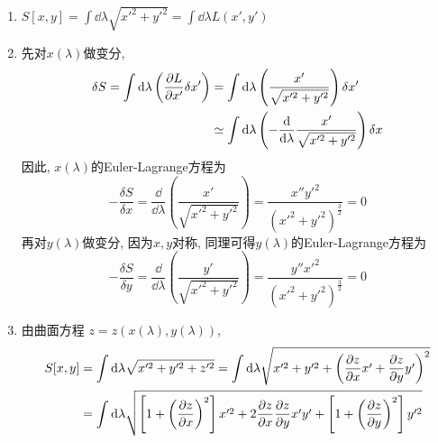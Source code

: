 \begin{solution}
    \begin{enumerate}[label=(\arabic*)]
        \item \(S[x,y] = \int \dd \lambda \sqrt{x'^2 + y'^2} = \int \dd \lambda L\left(x',y'\right)\)
        \item 先对\(x(\lambda)\)做变分, \[
        \begin{aligned}
            \delta S = \int \dd \lambda \left(\frac{\partial L}{\partial x'} \delta x'\right) &= \int \dd \lambda \left(\frac{x'}{\sqrt{x'^2+y'^2}}\right) \delta x' \\
            &\simeq \int \dd \lambda \left(- \frac{\dd}{\dd \lambda} \frac{x'}{\sqrt{x'^2+y'^2}}\right) \delta x
        \end{aligned}
        \]
        因此, \(x(\lambda)\)的Euler-Lagrange方程为
        \[
            -\frac{\delta S}{\delta x} = \frac{\dd}{\dd \lambda} \left( \frac{x'}{\sqrt{x'^2+y'^2}} \right) = \frac{x'' y'^2}{\left(x'^2 + y'^2\right)^{\frac{3}{2}}} = 0
        \]
        再对\(y(\lambda)\)做变分, 因为\(x,y\)对称, 同理可得\(y(\lambda)\)的Euler-Lagrange方程为
        \[
            -\frac{\delta S}{\delta y} = \frac{\dd}{\dd \lambda} \left( \frac{y'}{\sqrt{x'^2+y'^2}} \right) = \frac{y'' x'^2}{\left(x'^2 + y'^2\right)^{\frac{3}{2}}} = 0
        \]
        \item 由曲面方程 \(z = z(x(\lambda),y(\lambda))\), 
        \begin{align*}
            S[x,y]  &= \int \dd \lambda \sqrt{x'^2 + y'^2 + z'^2} 
                    = \int \dd \lambda \sqrt{x'^2 + y'^2 + \left(\frac{\partial z}{\partial x} x' + \frac{\partial z}{\partial y} y'\right)^2} \\
                    &= \int \dd \lambda \sqrt{\left[1 + \left(\frac{\partial z}{\partial x}\right)^2\right] x'^2 + 2 \frac{\partial z}{\partial x} \frac{\partial z}{\partial y} x' y' + \left[1 + \left(\frac{\partial z}{\partial y}\right)^2\right] y'^2}\\
        \end{align*}
        

\end{enumerate}
\end{solution}
